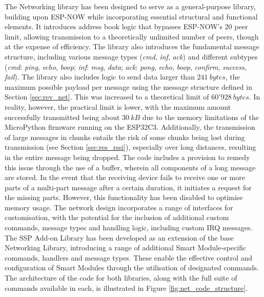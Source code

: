 The Networking library has been designed to serve as a general-purpose library, building upon ESP-NOW while incorporating essential structural and functional elements. It introduces address book logic that bypasses ESP-NOW's 20 peer limit, allowing transmission to a theoretically unlimited number of peers, though at the expense of efficiency. The library also introduces the fundamental message structure, including various message types (\textit{cmd}, \textit{inf}, \textit{ack}) and different subtypes (\textit{cmd}: \textit{ping}, \textit{echo}, \textit{boop}; \textit{inf}: \textit{msg}, \textit{data}; \textit{ack}: \textit{pong}, \textit{echo}, \textit{boop}, \textit{confirm}, \textit{success}, \textit{fail}). The library also includes logic to send data larger than $241\ bytes$, the maximum possible payload per message using the message structure defined in Section \ref{sec:rev_net}. This was increased to a theoretical limit of $60'928\ bytes$. In reality, however, the practical limit is lower, with the maximum amount successfully transmitted being about $30\ kB$ due to the memory limitations of the MicroPython firmware running on the ESP32C3. Additionally, the transmission of large messages in chunks entails the risk of some chunks being lost during transmission (see Section \ref{sec:res_rssi}), especially over long distances, resulting in the entire message being dropped. The code includes a provision to remedy this issue through the use of a buffer, wherein all components of a long message are stored. In the event that the receiving device fails to receive one or more parts of a multi-part message after a certain duration, it initiates a request for the missing parts. However, this functionality has been disabled to optimise memory usage. The network design incorporates a range of interfaces for customisation, with the potential for the inclusion of additional custom commands, message types and handling logic, including custom IRQ messages. \\

The SSP Add-on Library has been developed as an extension of the base Networking Library, introducing a range of additional Smart Module-specific commands, handlers and message types. These enable the effective control and configuration of Smart Modules through the utilisation of designated commands. The architecture of the code for both libraries, along with the full suite of commands available in each, is illustrated in Figure \ref{fig:net_code_structure}.\\

